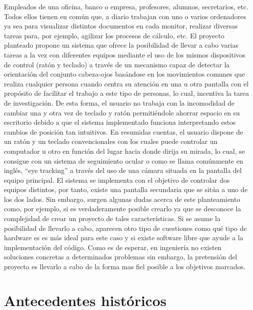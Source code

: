 Empleados de una oficina, banco o empresa, profesores, alumnos, secretarios, etc. Todos ellos tienen en común que, a diario trabajan con uno o varios ordenadores ya sea para visualizar distintos documentos en cada monitor, realizar diversas tareas para, por ejemplo, agilizar los procesos de cálculo, etc. El proyecto planteado propone un sistema que ofrece la posibilidad de llevar a cabo varias tareas a la vez con diferentes equipos mediante el uso de los mismos dispositivos de control (ratón y teclado) a través de un mecanismo capaz de detectar la orientación del conjunto cabeza-ojos basándose en los movimientos comunes que realiza cualquier persona cuando centra su atención en una u otra pantalla con el propósito de facilitar el trabajo a este tipo de personas, lo cual, incentiva la tarea de investigación. De esta forma, el usuario no trabaja con la incomodidad  de cambiar una y otra vez de teclado y ratón permitiéndole ahorrar espacio en su escritorio debido a que el sistema implementado funciona interpretando estos cambios de posición tan intuitivos. En resumidas cuentas, el usuario dispone de un ratón y un teclado convencionales con los cuales puede controlar un computador u otro en función del lugar hacia donde dirija su mirada, lo cual, se consigue con un sistema de seguimiento ocular o como se llama comúnmente en inglés, ``eye tracking'' a través del uso de una cámara situada en la pantalla del equipo principal. El sistema se implementa con el objetivo de controlar dos equipos distintos, por tanto, existe una pantalla secundaria que se sitúa a uno de los dos lados. Sin embargo, surgen algunas dudas acerca de este planteamiento como, por ejemplo, si es verdaderamente posible crearlo ya que se desconoce la complejidad de crear un proyecto de tales características. Si se asume la posibilidad de llevarlo a cabo, aparecen otro tipo de cuestiones como qué tipo de hardware es es más ideal para este caso y si existe software libre que ayude a la implementación del código. Como es de esperar, en ingeniería no existen soluciones concretas a determinados problemas sin embargo, la pretensión del proyecto es llevarlo a cabo de la forma mas fiel posible a los objetivos marcados.


\section{Antecedentes históricos} \label{s1_2}

